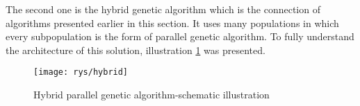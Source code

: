 The second one is the hybrid genetic algorithm which is the connection of
algorithms presented earlier in this section. It uses many populations in which
every subpopulation is the form of parallel genetic algorithm. To fully
understand the architecture of this solution, illustration \ref{fig:hybrid}
was presented.
\nopagebreak
\begin{figure}[!htb]
	\begin{center}
		\texttt{[image: rys/hybrid]}
	\end{center}
	\caption{Hybrid parallel genetic algorithm-schematic illustration}
	\label{fig:hybrid}
\end{figure}
